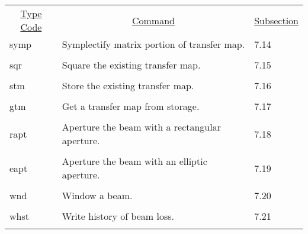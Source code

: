 \begin{center}
\begin{tabular}{lll}
\multicolumn{1}{c}{\underline{Type Code}} &
\multicolumn{1}{c}{\underline{Command}}   &
\multicolumn{1}{c}{\underline{Subsection}} \\
\hspace{1.5em}symp  & Symplectify matrix portion of transfer map. & \hspace{2em}7.14\\
\vspace{-3mm}& &\\
\hspace{1.5em}sqr   &        Square the existing transfer map.     & \hspace{2em}7.15\\
\vspace{-3mm}& &\\
\hspace{1.5em}stm   &        Store the existing transfer map.      & \hspace{2em}7.16\\
\vspace{-3mm}& &\\
\hspace{1.5em}gtm   &        Get a transfer map from storage.      & \hspace{2em}7.17\\
\vspace{-3mm}& &\\
\hspace{1.5em}rapt  & Aperture the beam with a rectangular aperture.& \hspace{2em}7.18\\
\vspace{-3mm}& &\\
\hspace{1.5em}eapt  & Aperture the beam with an elliptic aperture. & \hspace{2em}7.19\\
\vspace{-3mm}& &\\
\hspace{1.5em}wnd  &         Window a beam.                & \hspace{2em}7.20\\
\vspace{-3mm}& &\\
\hspace{1.5em}whst  &         Write history of beam loss.          & \hspace{2em}7.21\\
\vspace{-3mm}& &\\

\end{tabular}
\end{center}
